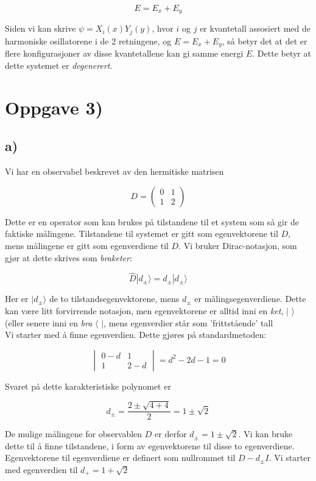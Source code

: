\documentclass[a4paper,norsk, 10pt]{article}
\numberwithin{equation}{section}
\begin{document}
$$
E = E_x +E_y
$$

Siden vi kan skrive $\psi = X_i(x)Y_j(y)$, hvor $i$ og $j$ er kvantetall assosiert med de harmoniske osillatorene i de 2 retningene, og $E = E_x + E_y$, så betyr det at det er flere konfigurasjoner av disse kvantetallene kan gi samme energi $E$. Dette betyr at dette systemet er \textit{degenerert}.

\section{Oppgave 3)}

\subsection*{a)}
Vi har en observabel beskrevet av den hermitiske matrisen

\begin{equation}
D =
\begin{pmatrix}
0 &1\\
1 &2
\end{pmatrix}
\end{equation}

Dette er en operator som kan brukes på tilstandene til et system som så gir de faktiske målingene. Tilstandene til systemet er gitt som egenvektorene til $D$, mens målingene er gitt som egenverdiene til $D$. Vi bruker Dirac-notasjon, som gjør at dette skrives  som \textit{braketer}:

$$
\hat{D}|d_{\pm}\rangle = d_{\pm}|d_{\pm}\rangle
$$

Her er $|d_{\pm}\rangle$ de to tilstandsegenvektorene, mens $d_{\pm}$ er målingsegenverdiene. Dette kan være litt forvirrende notasjon, men egenvektorene er alltid inni en \textit{ket}, $|$ $\rangle$(eller senere inni en \textit{bra} $\langle$ $|$, mens egenverdier står som  'frittstående' tall\\

Vi starter med å finne egenverdien. Dette gjøres på standardmetoden:

$$
\begin{vmatrix}
0 - d & 1\\
1 & 2-d
\end{vmatrix}
= d^2 - 2d - 1 = 0
$$

Svaret på dette karakteristiske polynomet er 

$$
d_{\pm} = \frac{2 \pm \sqrt{4 + 4}}{2} = 1\pm \sqrt{2}
$$

De mulige målingene for observablen $D$ er derfor $d_{\pm} = 1 \pm \sqrt{2}$. Vi kan bruke dette til å finne tilstandene, i form av egenvektorene til disse to egenverdiene. Egenvektorene til egenverdiene er definert som nullrommet til $D - d_{\pm}I$. Vi starter med egenverdien til $d_+ = 1 + \sqrt{2}$
\end{document}
